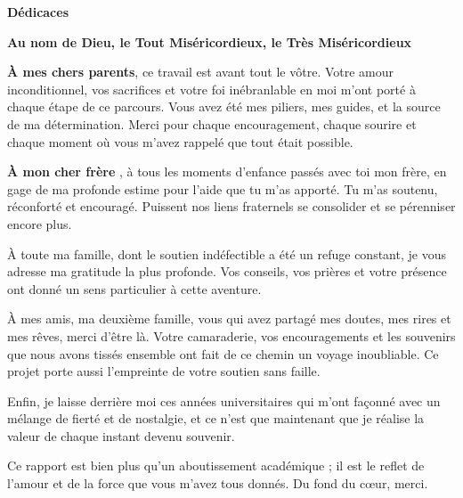 \clearpage
\thispagestyle{empty}

\begin{center}
    
    {\Huge \bfseries Dédicaces}
\end{center}


\vspace{1cm}
\begin{center}
 \textbf{ Au nom de Dieu, le Tout Miséricordieux, le Très Miséricordieux}
\end{center}
\vspace{1cm}
\textbf{À mes chers parents}, ce travail est avant tout le vôtre. Votre amour inconditionnel, vos sacrifices et votre foi inébranlable en moi m’ont porté à chaque étape de ce
parcours. Vous avez été mes piliers, mes guides, et la source de ma détermination. Merci pour
 chaque encouragement, chaque sourire et chaque moment où vous m’avez rappelé que tout était
possible.

\vspace{0.8cm}
\textbf{À mon cher frère }, à tous les moments d’enfance passés avec toi mon frère, en gage de ma profonde estime pour l’aide que tu m’as apporté. Tu m’as soutenu, réconforté et encouragé. Puissent nos liens fraternels se consolider et se pérenniser encore plus.

\vspace{0.8cm}
À toute ma famille, dont le soutien indéfectible a été un refuge constant, je vous adresse
ma gratitude la plus profonde. Vos conseils, vos prières et votre présence ont donné un sens
particulier à cette aventure. 

\vspace{0.8cm}
À mes amis, ma deuxième famille, vous qui avez partagé mes doutes, mes rires et mes
rêves, merci d’être là. Votre camaraderie, vos encouragements et les souvenirs que nous avons
tissés ensemble ont fait de ce chemin un voyage inoubliable. Ce projet porte aussi l’empreinte
de votre soutien sans faille.

\vspace{0.8cm}
Enfin, je laisse derrière moi ces années universitaires qui m'ont façonné avec un mélange de fierté et de nostalgie, et ce n'est que maintenant que je réalise la valeur de chaque instant devenu souvenir.

\vspace{0.8cm}
Ce rapport est bien plus qu’un aboutissement académique ; il est le reflet de l’amour et de la
force que vous m’avez tous donnés. Du fond du cœur, merci.

\clearpage